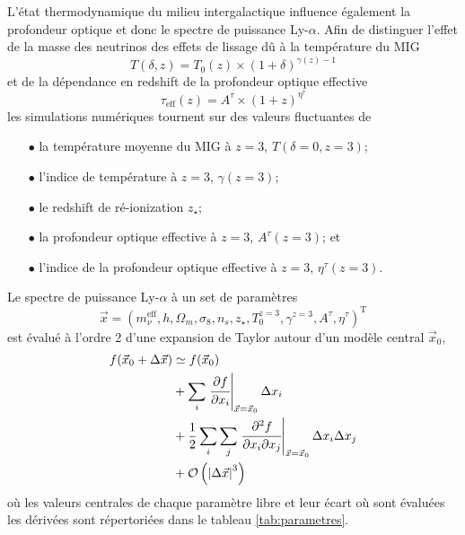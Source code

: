 L'état thermodynamique du milieu intergalactique influence également la profondeur optique et donc le spectre de puissance Ly-$\alpha$. Afin de distinguer l'effet de la masse des neutrinos des effets de lissage dû à la température du MIG
\begin{equation}
T(\delta, z) = T_0 (z) \times \left( 1 + \delta \right)^{\gamma(z) - 1}
\end{equation} et de la dépendance en redshift de la profondeur optique effective
\begin{equation}
\tau_\mathrm{eff} (z) = A^\tau \times \left( 1 + z \right)^{\eta^\tau}
\end{equation} les simulations numériques tournent sur des valeurs fluctuantes de \\
\begin{itemize}
\item[$\bullet$] la température moyenne du MIG à $z=3$, $T(\delta=0,z=3)$; \\
\item[$\bullet$] l'indice de température à $z=3$, $\gamma(z=3)$; \\
\item[$\bullet$] le redshift de ré-ionization $z_\star$; \\
\item[$\bullet$] la profondeur optique effective à $z=3$, $A^\tau (z=3)$; et \\
\item[$\bullet$] l'indice de la profondeur optique effective à $z=3$, $\eta^\tau (z=3)$. \\
\end{itemize} Le spectre de puissance Ly-$\alpha$ à un set de paramètres
\begin{equation}
\vec{x} = \left( m_\nu^\mathrm{eff}, h, \Omega_m, \sigma_8, n_s, z_\star, T_0^{z=3}, \gamma^{z=3}, A^\tau, \eta^\tau \right)^\mathrm{T}
\end{equation} est évalué à l'ordre 2 d'une expansion de Taylor autour d'un modèle central $\vec{x}_0$, 
\begin{align*}
f(\vec{x}_0 + \Delta \vec{x}) &\simeq f(\vec{x}_0)\\
&+ \sum_i \left. \cfrac{\partial f}{\partial x_i} \right\vert_{\vec{x} = \vec{x}_0} \Delta x_i \\
&+ \frac{1}{2}  \sum_{i} \sum_{j}  \left. \cfrac{\partial^2 f}{\partial x_i \partial x_j} \right\vert_{\vec{x} = \vec{x}_0} \Delta x_i \Delta x_j \\
&+ \mathcal{O} \left( \left\vert \Delta \vec{x} \right\vert^3 \right) 
\end{align*} où les valeurs centrales de chaque paramètre libre et leur écart où sont évaluées les dérivées sont répertoriées dans le tableau \ref{tab:parametres}. \\

